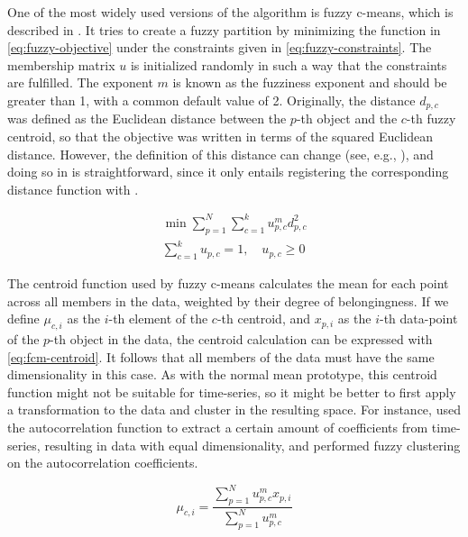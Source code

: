 One of the most widely used versions of the algorithm is fuzzy c-means,
which is described in \citet{bezdek1981}.
It tries to create a fuzzy partition by minimizing the function in \cref{eq:fuzzy-objective} under the constraints given in \cref{eq:fuzzy-constraints}.
The membership matrix $u$ is initialized randomly in such a way that the constraints are fulfilled.
The exponent $m$ is known as the fuzziness exponent and should be greater than 1,
with a common default value of 2.
Originally, the distance $d_{p,c}$ was defined as the Euclidean distance between the $p$-th object and the $c$-th fuzzy centroid,
so that the objective was written in terms of the squared Euclidean distance.
However, the definition of this distance can change (see, e.g., \citet{durso2009}),
and doing so in \dtwclust{} is straightforward,
since it only entails registering the corresponding distance function with .

\begin{subequations}
\begin{gather}
\min \sum^N_{p = 1} \sum^k_{c = 1} u^m_{p,c} d^2_{p,c} \label{eq:fuzzy-objective} \\
\sum^k_{c = 1} u_{p,c} = 1, \quad u_{p,c} \geq 0 \label{eq:fuzzy-constraints}
\end{gather}
\end{subequations}

The centroid function used by fuzzy c-means calculates the mean for each point across all members in the data,
weighted by their degree of belongingness.
If we define $\mu_{c,i}$ as the $i$-th element of the $c$-th centroid,
and $x_{p,i}$ as the $i$-th data-point of the $p$-th object in the data,
the centroid calculation can be expressed with \cref{eq:fcm-centroid}.
It follows that all members of the data must have the same dimensionality in this case.
As with the normal mean prototype,
this centroid function might not be suitable for time-series,
so it might be better to first apply a transformation to the data and cluster in the resulting space.
For instance,
\citet{durso2009} used the autocorrelation function to extract a certain amount of coefficients from time-series,
resulting in data with equal dimensionality,
and performed fuzzy clustering on the autocorrelation coefficients.

\begin{equation}
\label{eq:fcm-centroid}
\mu_{c,i} = \frac{\sum^N_{p = 1} u^m_{p,c} x_{p,i}}{\sum^N_{p = 1} u^m_{p,c}}
\end{equation}

